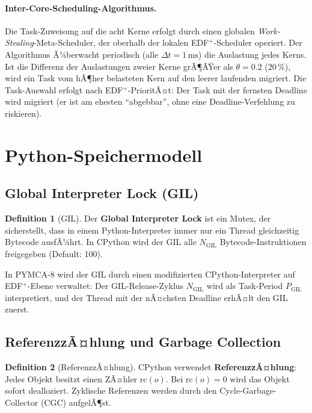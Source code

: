 ﻿\documentclass[a4paper,12pt]{scrreprt}
\theoremstyle{definition}
\newtheorem{definition}{Definition}[chapter]
\begin{document}
	\paragraph{Inter-Core-Scheduling-Algorithmus.}
	Die Task-Zuweisung auf die acht Kerne erfolgt durch einen globalen
	\emph{Work-Stealing}-Meta-Scheduler, der oberhalb der lokalen
	EDF$^+$-Scheduler operiert. Der Algorithmus Ã¼berwacht periodisch
	(alle $\Delta t = 1\,\text{ms}$) die Auslastung jedes Kerns. Ist
	die Differenz der Auslastungen zweier Kerne grÃ¶ÃŸer als $\theta = 0.2$
	(20\,\%), wird ein Task vom hÃ¶her belasteten Kern auf den leerer laufenden
	migriert. Die Task-Auswahl erfolgt nach EDF$^+$-PrioritÃ¤t: Der Task
	mit der fernsten Deadline wird migriert (er ist am ehesten ``abgebbar'',
	ohne eine Deadline-Verfehlung zu riskieren).
	
	\section{Python-Speichermodell}
	
	\subsection{Global Interpreter Lock (GIL)}
	
	\begin{definition}[GIL]
		Der \textbf{Global Interpreter Lock} ist ein Mutex, der sicherstellt,
		dass in einem Python-Interpreter immer nur ein Thread gleichzeitig
		Bytecode ausfÃ¼hrt. In CPython wird der GIL alle $N_{\mathrm{GIL}}$
		Bytecode-Instruktionen freigegeben (Default: 100).
	\end{definition}
	
	In PYMCA-8 wird der GIL durch einen modifizierten CPython-Interpreter
	auf EDF$^+$-Ebene verwaltet: Der GIL-Release-Zyklus $N_{\mathrm{GIL}}$
	wird als Task-Period $P_{\mathrm{GIL}}$ interpretiert, und der Thread
	mit der nÃ¤chsten Deadline erhÃ¤lt den GIL zuerst.
	
	\subsection{ReferenzzÃ¤hlung und Garbage Collection}
	
	\begin{definition}[ReferenzzÃ¤hlung]
		CPython verwendet \textbf{ReferenzzÃ¤hlung}: Jedes Objekt besitzt
		einen ZÃ¤hler $\mathrm{rc}(o)$. Bei $\mathrm{rc}(o) = 0$ wird das
		Objekt sofort dealloziert. Zyklische Referenzen werden durch den
		Cycle-Garbage-Collector (CGC) aufgelÃ¶st.
	\end{definition}
	
\end{document}
